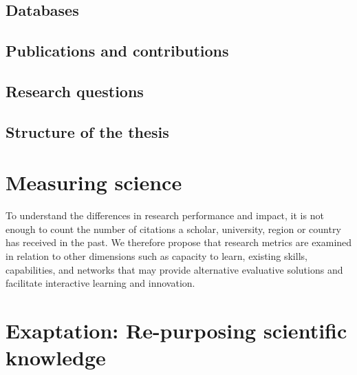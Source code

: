 \documentclass[draft,final]{vutinfth} %
\begin{document}
\section{Databases}

\section{Publications and contributions}

\section{Research questions}

\section{Structure of the thesis}

\chapter{Measuring science}

To understand the differences in research performance and impact, it is not enough to count the number of citations a scholar, university, region or country has received in the past. We therefore propose that research metrics are examined in relation to other dimensions such as capacity to learn, existing skills, capabilities, and networks that may provide alternative evaluative solutions and facilitate interactive learning and innovation. 
\chapter{Exaptation: Re-purposing scientific knowledge}
\end{document}
